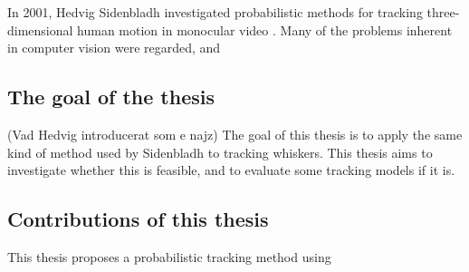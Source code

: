 In 2001, Hedvig Sidenbladh investigated probabilistic methods for tracking three-dimensional human motion in monocular video \cite{Hedvig}. Many of the problems inherent in computer vision were regarded, and

\subsection{The goal of the thesis}

(Vad Hedvig introducerat som e najz) The goal of this thesis is to apply the same kind of method used by Sidenbladh to tracking whiskers. This thesis aims to investigate whether this is feasible, and to evaluate some tracking models if it is.

\subsection{Contributions of this thesis}

This thesis proposes a probabilistic tracking method using
